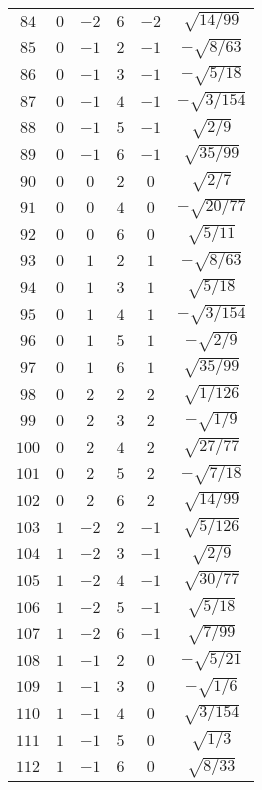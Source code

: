 \begin{table}
\begin{center}
\begin{tabular}{|c|c|c|c|c|c|}
$84$ & $0$ & $-2$ & $6$ & $-2$ & $\sqrt{14/99}$ \\ 
$85$ & $0$ & $-1$ & $2$ & $-1$ & $-\sqrt{8/63}$ \\ 
$86$ & $0$ & $-1$ & $3$ & $-1$ & $-\sqrt{5/18}$ \\ 
$87$ & $0$ & $-1$ & $4$ & $-1$ & $-\sqrt{3/154}$ \\ 
$88$ & $0$ & $-1$ & $5$ & $-1$ & $\sqrt{2/9}$ \\ 
$89$ & $0$ & $-1$ & $6$ & $-1$ & $\sqrt{35/99}$ \\ 
$90$ & $0$ & $0$ & $2$ & $0$ & $\sqrt{2/7}$ \\ 
$91$ & $0$ & $0$ & $4$ & $0$ & $-\sqrt{20/77}$ \\ 
$92$ & $0$ & $0$ & $6$ & $0$ & $\sqrt{5/11}$ \\ 
$93$ & $0$ & $1$ & $2$ & $1$ & $-\sqrt{8/63}$ \\ 
$94$ & $0$ & $1$ & $3$ & $1$ & $\sqrt{5/18}$ \\ 
$95$ & $0$ & $1$ & $4$ & $1$ & $-\sqrt{3/154}$ \\ 
$96$ & $0$ & $1$ & $5$ & $1$ & $-\sqrt{2/9}$ \\ 
$97$ & $0$ & $1$ & $6$ & $1$ & $\sqrt{35/99}$ \\ 
$98$ & $0$ & $2$ & $2$ & $2$ & $\sqrt{1/126}$ \\ 
$99$ & $0$ & $2$ & $3$ & $2$ & $-\sqrt{1/9}$ \\ 
$100$ & $0$ & $2$ & $4$ & $2$ & $\sqrt{27/77}$ \\ 
$101$ & $0$ & $2$ & $5$ & $2$ & $-\sqrt{7/18}$ \\ 
$102$ & $0$ & $2$ & $6$ & $2$ & $\sqrt{14/99}$ \\ 
$103$ & $1$ & $-2$ & $2$ & $-1$ & $\sqrt{5/126}$ \\ 
$104$ & $1$ & $-2$ & $3$ & $-1$ & $\sqrt{2/9}$ \\ 
$105$ & $1$ & $-2$ & $4$ & $-1$ & $\sqrt{30/77}$ \\ 
$106$ & $1$ & $-2$ & $5$ & $-1$ & $\sqrt{5/18}$ \\ 
$107$ & $1$ & $-2$ & $6$ & $-1$ & $\sqrt{7/99}$ \\ 
$108$ & $1$ & $-1$ & $2$ & $0$ & $-\sqrt{5/21}$ \\ 
$109$ & $1$ & $-1$ & $3$ & $0$ & $-\sqrt{1/6}$ \\ 
$110$ & $1$ & $-1$ & $4$ & $0$ & $\sqrt{3/154}$ \\ 
$111$ & $1$ & $-1$ & $5$ & $0$ & $\sqrt{1/3}$ \\ 
$112$ & $1$ & $-1$ & $6$ & $0$ & $\sqrt{8/33}$ \\ 

\end{tabular}
\end{center}
\end{table}
